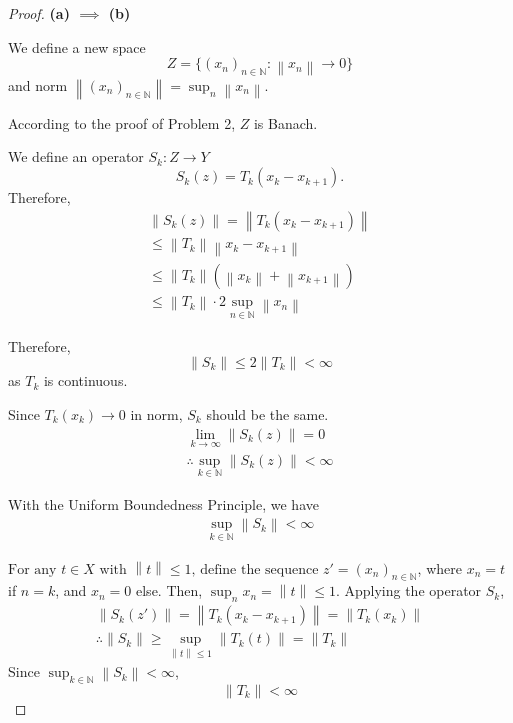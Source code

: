 \documentclass{article}
\newcommand{\norm}[1]{\left\|#1\right\|}
\newcommand{\N}{\mathbb{N}}
\begin{document}
\begin{proof}

\textbf{(a) $\implies$ (b)}

We define a new space 
$$
Z = \{ (x_n)_{n \in \N} : \norm{x_n} \rightarrow 0 \}
$$
and norm $ \norm{(x_n)_{n \in \N}} = \sup_{n} \norm{x_n} $.

According to the proof of Problem 2, $Z$ is Banach.

We define an operator $S_k: Z \rightarrow Y$
$$
S_k(z) = T_k(x_k - x_{k+1}).
$$
Therefore,
\begin{gather}
\norm{S_k(z)} = \norm{T_k(x_k - x_{k+1})} 
\\
\leq \norm{T_k} \norm{x_k - x_{k+1}} 
\\
\leq \norm{T_k} (\norm{x_k} + \norm{x_{k+1}})
\\
\leq \norm{T_k} \cdot 2 \sup_{n \in \N} \norm{x_n}
\end{gather}

Therefore, 
$$
\norm{S_k}  \leq 2 \norm{T_k} < \infty
$$
as $T_k$ is continuous.

Since $T_k(x_k) \rightarrow 0$ in norm, $S_k$ should be the same.
\begin{gather}
\lim_{k \to \infty} \norm{S_k(z)} = 0
\\
\therefore \sup_{k \in \N} \norm{S_k(z)} < \infty
\end{gather}

With the Uniform Boundedness Principle, we have
\begin{gather}
    \sup_{k \in \N} \norm{S_k} < \infty
\end{gather}


$
\text{For any } t \in X \text{ with }  \norm{t} \le 1 \text{, define the sequence } 
z' = (x_n)_{n \in \N}
$,  where $x_n = t$ if $n=k$, and $x_n = 0$ else.
Then,
$
\sup_{n} x_n = \norm{t} \le 1.
$
Applying the operator $S_k$,
\begin{gather}
    \norm{S_k(z')} = \norm{T_k(x_k - x_{k+1})} = \norm{T_k(x_k)} 
    \\
    \therefore \norm{S_k} \geq \sup_{\norm{t} \leq 1} \norm{T_k(t)} = \norm{T_k}
\end{gather}
Since $\sup_{k \in \N} \norm{S_k} < \infty$,
$$
\norm{T_k} < \infty
$$


\end{proof}
\end{document}
